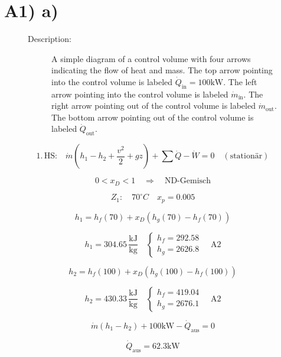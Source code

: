 \section*{A1) a)}

\begin{figure}[h!]
\centering
\begin{minipage}{0.5\textwidth}
\centering
\begin{description}
\item[Description:] A simple diagram of a control volume with four arrows indicating the flow of heat and mass. The top arrow pointing into the control volume is labeled $\dot{Q}_\text{in} = 100 \text{kW}$. The left arrow pointing into the control volume is labeled $\dot{m}_\text{in}$. The right arrow pointing out of the control volume is labeled $\dot{m}_\text{out}$. The bottom arrow pointing out of the control volume is labeled $\dot{Q}_\text{out}$.
\end{description}
\end{minipage}
\end{figure}

\[
1. \, \text{HS:} \quad \dot{m} (h_1 - h_2 + \frac{v^2}{2} + gz) + \sum \dot{Q} - \dot{W} = 0 \quad (\text{stationär})
\]

\[
0 < x_D < 1 \quad \Rightarrow \quad \text{ND-Gemisch}
\]

\[
Z_1: \quad 70^\circ C \quad x_p = 0.005
\]

\[
h_1 = h_f(70) + x_D (h_g(70) - h_f(70))
\]

\[
h_1 = 304.65 \, \frac{\text{kJ}}{\text{kg}} \quad \left\{ \begin{array}{l} h_f = 292.58 \\ h_g = 2626.8 \end{array} \right. \quad \text{A2}
\]

\[
h_2 = h_f(100) + x_D (h_g(100) - h_f(100))
\]

\[
h_2 = 430.33 \, \frac{\text{kJ}}{\text{kg}} \quad \left\{ \begin{array}{l} h_f = 419.04 \\ h_g = 2676.1 \end{array} \right. \quad \text{A2}
\]

\[
\dot{m} (h_1 - h_2) + 100 \text{kW} - \dot{Q}_\text{aus} = 0
\]

\[
\dot{Q}_\text{aus} = 62.3 \text{kW}
\]
